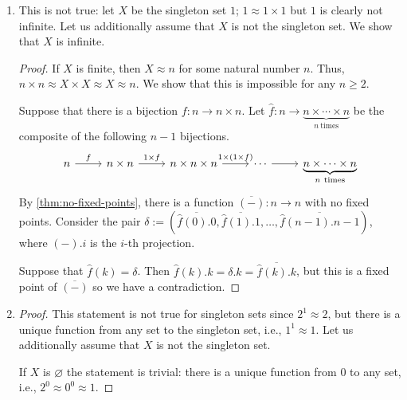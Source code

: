 \documentclass[a4paper]{article}
\newcommand{\To}[3]{#1\colon#2\to#3}
\begin{document}
\begin{enumerate}
\item This is not true: let $X$ be the singleton set $1$; $1 \approx 1 \times 1$ but $1$ is clearly not infinite.
  Let us additionally assume that $X$ is not the singleton set.
  We show that $X$ is infinite.
  \begin{proof}
    If $X$ is finite, then $X \approx n$ for some natural number $n$.
    Thus, $n \times n \approx X \times X \approx X \approx n$.
    We show that this is impossible for any $n \geq 2$.

    Suppose that there is a bijection $\To{f}{n}{n \times n}$.
    Let $\To{\hat{f}}{n}{\underbrace{n \times \cdots \times n}_{n~\text{times}}}$ be the composite of the following $n - 1$ bijections.
    \[\begin{tikzcd}
	n & {n \times n} & {n \times n \times n} & \cdots & {\underbrace{n \times \cdots \times n}_{n~\text{times}}}
	\arrow["f", from=1-1, to=1-2]
	\arrow["{1 \times f}", from=1-2, to=1-3]
	\arrow["{1 \times (1 \times f)}", from=1-3, to=1-4]
	\arrow[from=1-4, to=1-5]
      \end{tikzcd}\]
    By \cref{thm:no-fixed-points}, there is a function $\To{\overline{(-)}}{n}{n}$ with no fixed points.
    Consider the pair $\delta := (\overline{\hat{f}(0).0},\overline{\hat{f}(1).1},\ldots,\overline{\hat{f}(n-1).n-1})$, where $(-).i$ is the $i$-th projection.

    Suppose that $\hat{f}(k) = \delta$.
    Then $\hat{f}(k).k = \delta.k = \overline{\hat{f}(k).k}$, but this is a fixed point of $\overline{(-)}$ so we have a contradiction.
  \end{proof}
\item
  \begin{proof}
    This statement is not true for singleton sets since $2^{1} \approx 2$, but there is a unique function from any set to the singleton set, i.e., $1^{1} \approx 1$.
    Let us additionally assume that $X$ is not the singleton set.
    
    If $X$ is $\varnothing$ the statement is trivial: there is a unique function from $0$ to any set, i.e., $2^{0} \approx 0^{0} \approx 1$.
    

\end{proof}
\end{enumerate}
\end{document}
